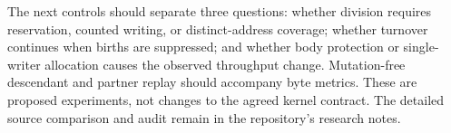The next controls should separate three questions: whether division requires
reservation, counted writing, or distinct-address coverage; whether turnover
continues when births are suppressed; and whether body protection or
single-writer allocation causes the observed throughput change. Mutation-free
descendant and partner replay should accompany byte metrics. These are
proposed experiments, not changes to the agreed kernel contract. The detailed
source comparison and audit remain in the repository's research notes.
